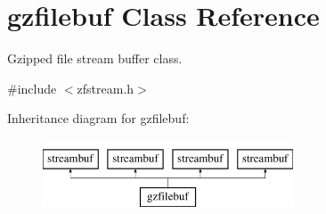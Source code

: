 \hypertarget{classgzfilebuf}{}\section{gzfilebuf Class Reference}
\label{classgzfilebuf}


Gzipped file stream buffer class.  




{\ttfamily \#include $<$zfstream.\+h$>$}

Inheritance diagram for gzfilebuf\+:\begin{figure}[H]
\begin{center}
\leavevmode
\includegraphics[height=2.000000cm]{classgzfilebuf}
\end{center}
\end{figure}
